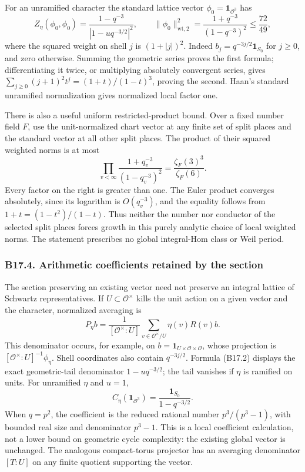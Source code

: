 For an unramified character the standard lattice vector \(\phi_0=\mathbf1_{\mathcal O^3}\) has \[
 Z_\eta(\phi_0,\phi_0)=\frac{1-q^{-3}}{|1-uq^{-3/2}|^2},\qquad
 \|\phi_0\|_{\mathrm{wt},2}^2
 =\frac{1+q^{-3}}{(1-q^{-3})^2}\le\frac{72}{49},
\tag{B17.7}
\] where the squared weight on shell \(j\) is \((1+|j|)^2\). Indeed \(b_j=q^{-3j/2}\mathbf1_{S_0}\) for \(j\ge0\), and zero otherwise. Summing the geometric series proves the first formula; differentiating it twice, or multiplying absolutely convergent series, gives \(\sum_{j\ge0}(j+1)^2t^j=(1+t)/(1-t)^3\), proving the second. Haan's standard unramified normalization gives normalized local factor one.

There is also a useful uniform restricted-product bound. Over a fixed number field \(F\), use the unit-normalized chart vector at any finite set of split places and the standard vector at all other split places. The product of their squared weighted norms is at most \[
 \prod_{v<\infty}\frac{1+q_v^{-3}}{(1-q_v^{-3})^2}
 =\frac{\zeta_F(3)^3}{\zeta_F(6)}.
\tag{B17.8}
\] Every factor on the right is greater than one. The Euler product converges absolutely, since its logarithm is \(O(q_v^{-3})\), and the equality follows from \(1+t=(1-t^2)/(1-t)\). Thus neither the number nor conductor of the selected split places forces growth in this purely analytic choice of local weighted norms. The statement prescribes no global integral-Hom class or Weil period.

\subsubsection{B17.4. Arithmetic coefficients retained by the section}\label{b17.4.-arithmetic-coefficients-retained-by-the-section}

The section preserving an existing vector need not preserve an integral lattice of Schwartz representatives. If \(U\subset\mathcal O^\times\) kills the unit action on a given vector and the character, normalized averaging is \[
 P_\eta b=\frac1{[\mathcal O^\times:U]}
       \sum_{v\in\mathcal O^\times/U}\eta(v)R(v)b.
\tag{B17.9}
\] This denominator occurs, for example, on \(b=\mathbf1_{U\times\mathcal O\times\mathcal O}\), whose projection is \([\mathcal O^\times:U]^{-1}\phi_\eta\). Shell coordinates also contain \(q^{-3j/2}\). Formula (B17.2) displays the exact geometric-tail denominator \(1-uq^{-3/2}\); the tail vanishes if \(\eta\) is ramified on units. For unramified \(\eta\) and \(u=1\), \[
 C_\eta(\mathbf1_{\mathcal O^3})
       =\frac{\mathbf1_{S_0}}{1-q^{-3/2}}.
\tag{B17.10}
\] When \(q=p^2\), the coefficient is the reduced rational number \(p^3/(p^3-1)\), with bounded real size and denominator \(p^3-1\). This is a local coefficient calculation, not a lower bound on geometric cycle complexity: the existing global vector is unchanged. The analogous compact-torus projector has an averaging denominator \([T:U]\) on any finite quotient supporting the vector.

